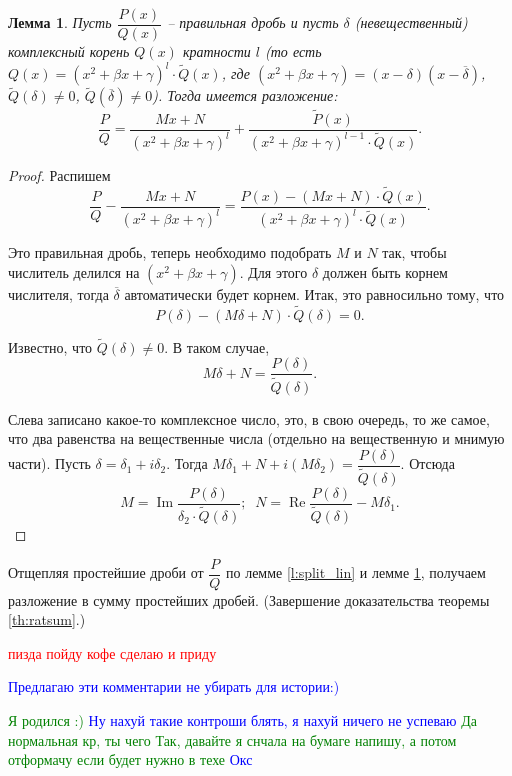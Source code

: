 \documentclass{article}
\theoremstyle{plain}
\newtheorem{lemma}{Лемма}
\theoremstyle{definition}
\theoremstyle{remark}
\renewcommand{\*}{\cdot}
\renewcommand{\Re}{\operatorname{Re}}
\renewcommand{\Im}{\operatorname{Im}}
\begin{document}
\begin{lemma}\label{l:split_square}
Пусть $\dfrac{P(x)}{Q(x)}$ -- правильная дробь и пусть $\delta$ (невещественный) комплексный корень $Q(x)$ кратности $l$ (то есть $Q(x) = (x^2+ \beta x + \gamma)^{l}\cdot \widetilde{Q}(x)$, где $(x^2+ \beta x + \gamma)=(x-\delta)(x-\overline{\delta})$, $\widetilde{Q}(\delta) \neq 0 $,  $\widetilde{Q}(\overline{\delta}) \neq 0$). 
Тогда имеется разложение:
$$\frac{P}{Q} = \frac{Mx + N}{(x^2 + \beta x + \gamma)^l} + \frac{\widetilde{P}(x)}{(x^2 + \beta x + \gamma)^{l-1}\cdot \widetilde{Q}(x)}.$$
\end{lemma}

\begin{proof}
Распишем $$\dfrac{P}{Q} - \frac{Mx + N}{(x^2 + \beta x + \gamma)^l} = \frac{P(x)-(Mx + N)\cdot \widetilde{Q}(x)}{(x^2 + \beta x + \gamma)^l \cdot \widetilde{Q}(x)}.$$ 

Это правильная дробь, теперь необходимо подобрать $M$ и $N$ так, чтобы числитель делился на $(x^2 + \beta x + \gamma).$ Для этого $\delta$ должен быть корнем числителя, тогда $\overline{\delta}$ автоматически будет корнем. Итак, это равносильно тому, что \[P(\delta) - (M\delta + N) \cdot \widetilde{Q}(\delta) = 0.\] 

Известно, что $\widetilde{Q}(\delta) \neq 0.$ В таком случае, \[M\delta + N = \frac{P(\delta)}{\widetilde{Q}(\delta)}.\]

Слева записано какое-то комплексное число, это, в свою очередь, то же самое, что два равенства на вещественные числа (отдельно на вещественную и мнимую части). Пусть $\delta = \delta_1 + i\delta_2.$ Тогда $M\delta_1 + N + i(M\delta_2) = \dfrac{P(\delta)}{\widetilde{Q}(\delta)}.$ Отсюда \[M = \Im\frac{P(\delta)}{\delta_2\cdot \widetilde{Q}(\delta)};\;\; N = \Re\frac{P(\delta)}{\widetilde{Q}(\delta)} - M\delta_1.\] 
\end{proof}

Отщепляя простейшие дроби от $\dfrac{P}{Q}$ по лемме \ref{l:split_lin} и лемме \ref{l:split_square}, получаем разложение в сумму простейших дробей. (Завершение доказательства теоремы \ref{th:ratsum}.)

\textcolor{red}{пизда
пойду кофе сделаю и приду}

\textcolor{blue}{Предлагаю эти комментарии не убирать для истории:)}

\textcolor{green}{Я родился :)}
\textcolor{blue}{Ну нахуй такие контроши блять, я нахуй ничего не успеваю}
\textcolor{green}{Да нормальная кр, ты чего}
\textcolor{green}{Так, давайте я снчала на бумаге напишу, а потом отформачу если будет нужно в техе}
\textcolor{blue}{Окс}
\end{document}
